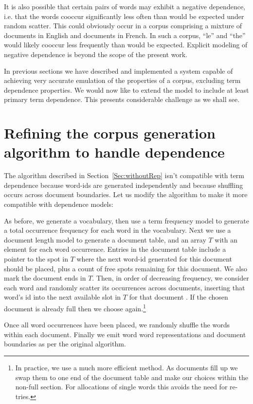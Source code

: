 \documentclass[11pt]{report}
\begin{document}
It is also possible that certain pairs of words may exhibit a negative
dependence, i.e. that the words cooccur significantly less often than
would be expected under random scatter.   This could obviously occur
in a corpus comprising a mixture of documents in English and documents in French.
In such a corpus, ``le'' and ``the'' would likely cooccur less
frequently than would be expected.  Explicit modeling of negative dependence is
beyond the scope of the present work.

In previous sections we have described and implemented a system capable of achieving very
accurate emulation of the properties of a corpus, excluding term
dependence properties.  We would now like to extend the model to
include at least primary term dependence.  This presents considerable
challenge as we shall see.


\section{Refining the corpus generation algorithm to handle
  dependence}

The algorithm described in Section~\ref{Sec:withoutRep} isn't
compatible with term dependence because word-ids are generated
independently and because shuffling occurs across document boundaries.
Let us modify the algorithm to make it more compatible with dependence
models:


As before, we generate a vocabulary, then use a term frequency model to
generate a total occurrence frequency for each word in the vocabulary.
Next we use a document length model to generate a document table, and
an array $T$ with an element for each word occurrence.  Entries in the
document table include a pointer to the spot in $T$ where the next
word-id generated for this document should be placed, plus a count of
free spots remaining for this document.  We also mark the document
ends in $T$. Then, in order of decreasing frequency,
we consider each word and randomly scatter its occurrences across
documents, inserting that word's id into the next available slot in
$T$ for that document .  If the chosen document is already full then we
choose again.\footnote{In practice, we use a much more efficient
  method. As documents fill up we swap them to one end of the document
  table and make our choices within the non-full section.  For
  allocations of single words this avoids the need for re-tries.}

Once all word occurrences have been placed, we randomly shuffle the
words within each document.  Finally we emit word word
representations and document boundaries as per the original algorithm.
\end{document}
